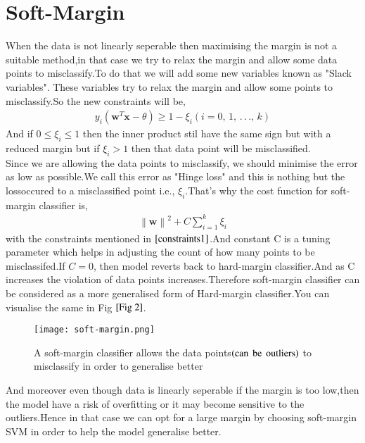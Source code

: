 \documentclass[journal,12pt,onecolumn]{IEEEtran}
\providecommand{\brak}[1]{\ensuremath{\left(#1\right)}}
\theoremstyle{remark}
\providecommand{\norm}[1]{\left\lVert#1\right\rVert}
\numberwithin{equation}{section}
\let\vec\mathbf
\begin{document}
            \section{Soft-Margin}
	      When the data is not linearly seperable then maximising the margin is not a suitable method,in that case we try to relax the margin and allow some data points to misclassify.To do that we will add some new variables known as "Slack variables". These variables try to relax the margin and allow some points to misclassify.So the new constraints will be,
	           \begin{align}
			   y_i\brak{\vec{w}^T\vec{x} -\theta} \geq 1-\xi_i \brak{i = 0,\,1,\,.\,.\,.,\,k}\label{constraints1}
                   \end{align}
And if $0\leq \xi_i \leq 1$ then the inner product stil have the same sign but with a reduced margin but if $\xi_i > 1$ then that data point will be misclassified.\\
Since we are allowing the data points to misclassify, we should minimise the error as low as possible.We call this error as "Hinge loss" and this is nothing but the lossoccured to a misclassified point i.e., $\xi_i$.That's why the cost function for soft-margin classifier is,
                   \begin{align}
			   \norm{\vec{w}}^2 + C\sum_{i=1}^k\xi_i
                   \end{align}
		with the constraints mentioned in $\eqref{constraints1}$.And constant C is a tuning parameter which helps in adjusting the count of how many points to be misclassifed.If $C =0$, then model reverts back to hard-margin classifier.And as C increases the violation of data points increases.Therefore soft-margin classifier can be considered as a more generalised form of Hard-margin classifier.You can visualise the same in Fig $\ref{Fig 2}$.\\
		 \begin{figure}[!h]
	          \centering
		  \texttt{[image: soft-margin.png]}
		  \caption{A soft-margin classifier allows the data points\brak{\text{can\, be\, outliers}} to misclassify in order to generalise better}
	          \label{Fig 2}
	         \end{figure}
 		And moreover even though data is linearly seperable if the margin is too low,then the model have a risk of overfitting or it may become sensitive to the outliers.Hence in that case we can opt for a large margin by choosing soft-margin SVM in order to help the model generalise better.
\end{document}
